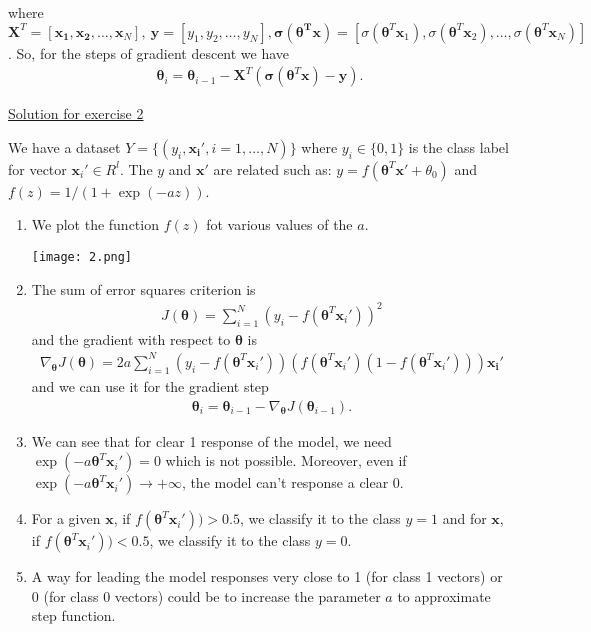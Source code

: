 \documentclass[12pt]{book}
\begin{document}
where $\pmb{X}^T = [\pmb{x_1}, \pmb{x_2}, \dots, \pmb{x}_N], \  \pmb{y} = [y_1,y_2,\dots,y_N], \pmb{\sigma}(\pmb{\theta^Tx}) = [\sigma(\pmb{\theta}^T\pmb{x}_1),\sigma(\pmb{\theta   }^T\pmb{x}_2),\dots, \sigma(\pmb{\theta}^T\pmb{x}_N)]$. So, for the steps of gradient descent we have
\begin{align*}
\pmb{\theta}_i = \pmb{\theta}_{i-1} -  \pmb{X}^T (\pmb{\sigma}(\pmb{\theta}^T\pmb{x})- \pmb{y}).
\end{align*}


\vspace{0.3 cm}
{\underline{\large Solution for exercise 2}}
\vspace{0.3 cm}

We have a dataset $Y = \{(y_i,\pmb{x_i}',i=1,\dots,N)\}$ where $y_i \in \{0,1\}$ is the class label for vector $\pmb{x}_i' \in R^l$. The $y$ and $\pmb{x}'$ are related such as: $y = f(\pmb{\theta}^T\pmb{ x}' + \theta_0)$ and $f(z) = 1/(1+\exp(-az))$.

\begin{enumerate}[label=(\alph*)]
	\item We plot the function $f(z)$ fot various values of the $a$.
\begin{center}
\texttt{[image: 2.png]}
\end{center}
	\item The sum of error squares criterion is
\begin{align*}
J(\pmb{\theta}) = \sum_{i=1}^{N} \left(y_i - f(\pmb{\theta}^T\pmb{ x}_i') \right)^2
\end{align*}
and the gradient with respect to $\pmb{\theta}$ is
\begin{align*}
\nabla_{\pmb{\theta}} J(\pmb{\theta}) = 2a \sum_{i=1}^{N} \left(y_i - f(\pmb{\theta}^T\pmb{ x}_i') \right) \left( f(\pmb{\theta}^T\pmb{ x}_i') (1 - f(\pmb{\theta}^T\pmb{ x}_i')) \right) \pmb{x_i}'
\end{align*}
and we can use it for the gradient step
\begin{align*}
\pmb{\theta}_i = \pmb{\theta}_{i-1} - \nabla_{\pmb{\theta}} J(\pmb{\theta}_{i-1}).
\end{align*}
\item We can see that for clear 1 response of the model, we need $\exp(-a\pmb{\theta}^T\pmb{ x}_i') = 0$ which is not possible. Moreover, even if $\exp(-a\pmb{\theta}^T\pmb{ x}_i') \rightarrow +\infty$, the model can't response a clear 0.
\item For a given $\pmb{x}$, if $f(\pmb{\theta}^T\pmb{ x}_i')) > 0.5$, we classify it to the class $y=1$ and for $\pmb{x}$, if $f(\pmb{\theta}^T\pmb{ x}_i')) < 0.5$, we classify it to the class $y=0$.
\item A way for leading the model responses very close to 1 (for class 1
vectors) or 0 (for class 0 vectors) could be to increase the parameter $a$ to approximate step function.
\end{enumerate}
\end{document}
